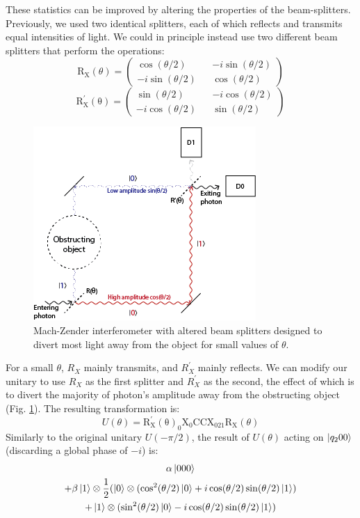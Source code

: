 \documentclass{article}
\newcommand{\X}{\text{X}}
\newcommand{\RX}{\mathrm{R_X}}
\newcommand{\CCX}{\text{CCX}}
\begin{document}
These statistics can be improved by altering the properties of the beam-splitters. Previously, we used two identical splitters, each of which reflects and transmits equal intensities of light. We could in principle instead use two different beam splitters that perform the operations:
$$\RX(\theta) = \begin{pmatrix}
\cos(\theta / 2) && -i\sin(\theta / 2)\\
-i\sin(\theta / 2) && \cos(\theta / 2)
\end{pmatrix}$$
$$\mathrm{R^\prime_X(\theta)} = \begin{pmatrix}
\sin(\theta / 2) && -i\cos(\theta / 2)\\
-i\cos(\theta / 2) && \sin(\theta / 2)
\end{pmatrix}$$
\begin{figure} \label{fig:circuit-improved}
\includegraphics[scale=0.8]{mach-zender-improved}
\centering
\caption{Mach-Zender interferometer with altered beam splitters designed to divert most light away from the object for small values of $\theta$.}
\end{figure}
For a small $\theta$, $R_X$ mainly transmits, and $R^\prime_X$ mainly reflects. We can modify our unitary to use $R_X$ as the first splitter and $R^\prime_X$ as the second, the effect of which is to divert the majority of photon's amplitude away from the obstructing object (Fig. \ref{fig:circuit-improved}). The resulting transformation is:
$$U(\theta) = \mathrm{R^\prime_X(\theta)_0} \X_0 \CCX_{021} \RX(\theta)$$
Similarly to the original unitary $U(-\pi/2)$, the result of $U(\theta)$ acting on $\ket{q_200}$ (discarding a global phase of $-i$) is:
\begin{multline}
\alpha\ket{000} \\+ \beta \ket 1 \otimes \frac{1}{2}(\ket0 \otimes (\cos^2(\theta/2)\ket 0 + i \cos(\theta/2)\sin(\theta/2)\ket 1)\\+ \ket 1 \otimes (\sin^2(\theta/2)\ket 0 - i\cos(\theta/2)\sin(\theta/2)\ket 1)
\end{multline}
\end{document}
